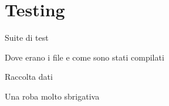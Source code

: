 \section{Testing}


\begin{frame}{Suite di test}

Dove erano i file e come sono stati compilati

\end{frame}


\begin{frame}{Raccolta dati}

Una roba molto sbrigativa

\end{frame}
